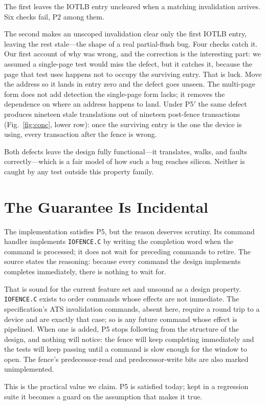 \documentclass[conference]{IEEEtran}
\newcommand{\cmd}[1]{\mbox{\texttt{#1}}}
\begin{document}
The first leaves the IOTLB entry uncleared when a matching invalidation arrives.
Six checks fail, P2 among them.

The second makes an unscoped invalidation clear only the first IOTLB entry,
leaving the rest stale---the shape of a real partial-flush bug. Four checks
catch it. Our first account of why was wrong, and the correction is the
interesting part: we assumed a single-page test would miss the defect, but it
catches it, because the page that test uses happens not to occupy the surviving
entry. That is luck. Move the address so it lands in entry zero and the defect
goes unseen. The multi-page form does not add detection the single-page form
lacks; it removes the dependence on where an address happens to land. Under P5$'$ the same defect produces nineteen stale
translations out of nineteen post-fence transactions (Fig.~\ref{fig:conc}, lower
row): once the surviving entry is the one the device is using, every transaction
after the fence is wrong.

Both defects leave the design fully functional---it translates, walks, and
faults correctly---which is a fair model of how such a bug reaches silicon.
Neither is caught by any test outside this property family.

\section{The Guarantee Is Incidental}
The implementation satisfies P5, but the reason deserves scrutiny. Its command
handler implements \cmd{IOFENCE.C} by writing the completion word when the
command is processed; it does not wait for preceding commands to retire. The
source states the reasoning: because every command the design implements
completes immediately, there is nothing to wait for.

That is sound for the current feature set and unsound as a design property.
\cmd{IOFENCE.C} exists to order commands whose effects are not immediate. The
specification's ATS invalidation commands, absent here, require a round trip to
a device and are exactly that case; so is any future command whose effect is
pipelined. When one is added, P5 stops following from the structure of the
design, and nothing will notice: the fence will keep completing immediately and
the tests will keep passing until a command is slow enough for the window to
open. The fence's predecessor-read and predecessor-write bits are also marked
unimplemented.

This is the practical value we claim. P5 is satisfied today; kept in a
regression suite it becomes a guard on the assumption that makes it true.
\end{document}
